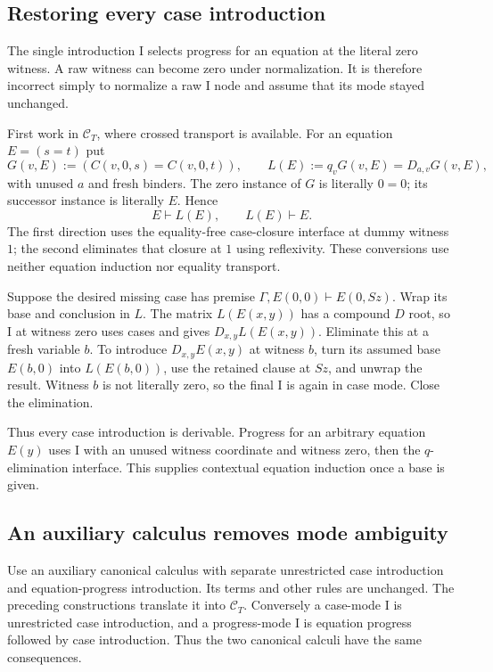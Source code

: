 \documentclass[11pt]{article}
\theoremstyle{definition}
\theoremstyle{remark}
\newcommand{\CT}{\mathcal C_T}
\begin{document}
\subsection{Restoring every case introduction}

The single introduction I selects progress for an equation at the literal
zero witness. A raw witness can become zero under normalization.
It is therefore incorrect simply to normalize a raw I node and assume that
its mode stayed unchanged.

First work in $\CT$, where crossed transport is available. For an equation
$E=(s=t)$ put
\[
 G(v,E):=(C(v,0,s)=C(v,0,t)),\qquad
 L(E):=q_vG(v,E)=D_{a,v}G(v,E),
\]
with unused $a$ and fresh binders. The zero instance of $G$ is literally
$0=0$; its successor instance is literally $E$. Hence
\[
 E\vdash L(E),\qquad L(E)\vdash E.
\]
The first direction uses the equality-free case-closure interface at dummy
witness $1$; the second eliminates that closure at $1$ using reflexivity.
These conversions use neither equation induction nor equality transport.

Suppose the desired missing case has premise
$\Gamma,E(0,0)\vdash E(0,Sz)$. Wrap its base and conclusion in $L$.
The matrix $L(E(x,y))$ has a compound $D$ root, so I at witness zero uses
cases and gives $D_{x,y}L(E(x,y))$. Eliminate this at a fresh variable $b$.
To introduce $D_{x,y}E(x,y)$ at witness $b$, turn its assumed base
$E(b,0)$ into $L(E(b,0))$, use the retained clause at $Sz$, and unwrap
the result. Witness $b$ is not literally zero, so the final I is again
in case mode. Close the elimination.

Thus every case introduction is derivable. Progress for an arbitrary
equation $E(y)$ uses I with an unused witness coordinate and witness zero,
then the $q$-elimination interface. This supplies contextual equation
induction once a base is given.

\subsection{An auxiliary calculus removes mode ambiguity}

Use an auxiliary canonical calculus with separate unrestricted case
introduction and equation-progress introduction. Its terms and other
rules are unchanged. The preceding constructions translate it into
$\CT$. Conversely a case-mode I is unrestricted case introduction, and
a progress-mode I is equation progress followed by case introduction.
Thus the two canonical calculi have the same consequences.
\end{document}
